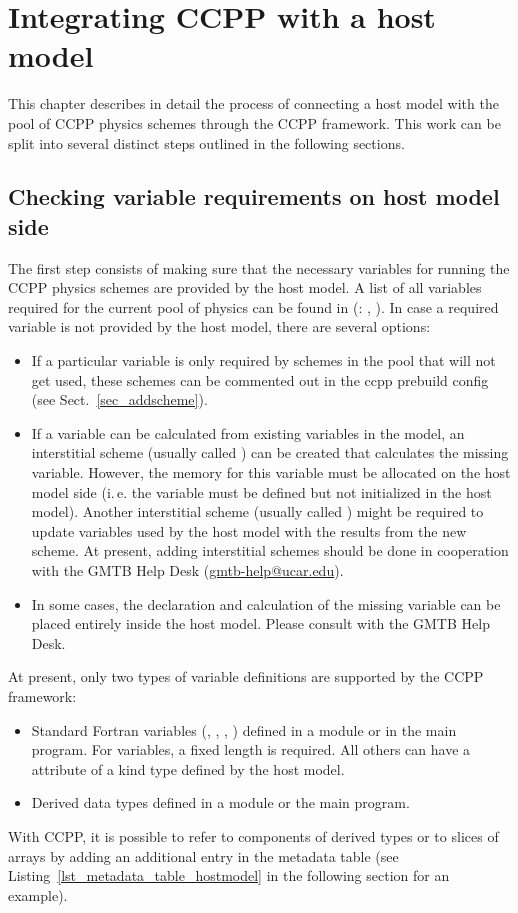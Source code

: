 \chapter{Integrating CCPP with a host model}
\label{chap_hostmodel}
\setlength{\parskip}{12pt}
This chapter describes in detail the process of connecting a host model with the pool of CCPP physics schemes through the CCPP framework. This work can be split into several distinct steps outlined in the following sections.

\section{Checking variable requirements on host model side}
The first step consists of making sure that the necessary variables for running the CCPP physics schemes are provided by the host model. A list of all variables required for the current pool of physics can be found in  (: , ). In case a required variable is not provided by the host model, there are several options:
\begin{itemize}
\item If a particular variable is only required by schemes in the pool that will not get used, these schemes can be commented out in the ccpp prebuild config (see Sect.~\ref{sec_addscheme}).
\item If a variable can be calculated from existing variables in the model, an interstitial scheme (usually called ) can be created that calculates the missing variable. However, the memory for this variable must be allocated on the host model side (i.\,e. the variable must be defined but not initialized in the host model). Another interstitial scheme (usually called ) might be required to update variables used by the host model with the results from the new scheme. At present, adding interstitial schemes should be done in cooperation with the GMTB Help Desk (\url{gmtb-help@ucar.edu}).
\item In some cases, the declaration and calculation of the missing variable can be placed entirely inside the host model. Please consult with the GMTB Help Desk.
\end{itemize}

At present, only two types of variable definitions are supported by the CCPP framework:
\begin{itemize}
\item Standard Fortran variables (, , , ) defined in a module or in the main program. For  variables, a fixed length is required. All others can have a  attribute of a kind type defined by the host model.
\item Derived data types defined in a module or the main program.
\end{itemize}
With CCPP, it is possible to refer to components of derived types or to slices of arrays by adding an additional entry in the metadata table (see Listing~\ref{lst_metadata_table_hostmodel} in the following section for an example).

